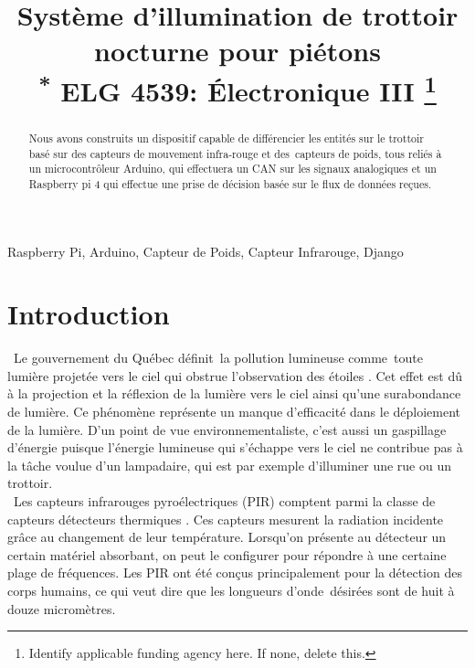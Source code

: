 \documentclass[journal]{IEEEtran}
\begin{document}
\title{Système d’illumination de trottoir nocturne pour piétons \\
{\footnotesize \textsuperscript{*} ELG 4539: Électronique III}
\thanks{Identify applicable funding agency here. If none, delete this.}
}

\author{
\and
{}

}

\maketitle

\begin{abstract}
    Nous avons construits un dispositif capable de différencier les entités 
    sur le trottoir basé sur des capteurs de mouvement infra-rouge et des capteurs de poids, 
    tous reliés à un microcontrôleur Arduino, qui effectuera un CAN sur les signaux analogiques 
    et un Raspberry pi 4 qui effectue une prise de décision basée sur le flux de données reçues.
\end{abstract}

\begin{IEEEkeywords}
Raspberry Pi, Arduino, Capteur de Poids, Capteur Infrarouge, Django
\end{IEEEkeywords}

\section{Introduction}
 Le gouvernement du Québec définit la pollution lumineuse comme toute 
lumière projetée vers le ciel qui obstrue l'observation des étoiles \cite{b1}.
 Cet effet est dû à la projection et la réflexion de la lumière vers le ciel ainsi qu'une surabondance de lumière.
  Ce phénomène représente un manque d'efficacité dans le déploiement de la lumière. D'un point de vue environnementaliste, 
  c'est aussi un gaspillage d'énergie puisque l'énergie lumineuse qui s'échappe vers le ciel ne contribue pas à la tâche voulue d'un lampadaire, 
  qui est par exemple d'illuminer une rue ou un trottoir. \\
   Les capteurs infrarouges pyroélectriques (PIR) comptent parmi la classe de capteurs détecteurs thermiques \cite{b2}. 
  Ces capteurs mesurent la radiation incidente grâce au changement de leur température. Lorsqu'on présente au détecteur un certain matériel absorbant, on peut le configurer pour répondre à une certaine plage de fréquences. 
  Les PIR ont été conçus principalement pour la détection des corps humains, ce qui veut dire que les longueurs d'onde désirées sont de huit à douze micromètres. 
\end{document}
